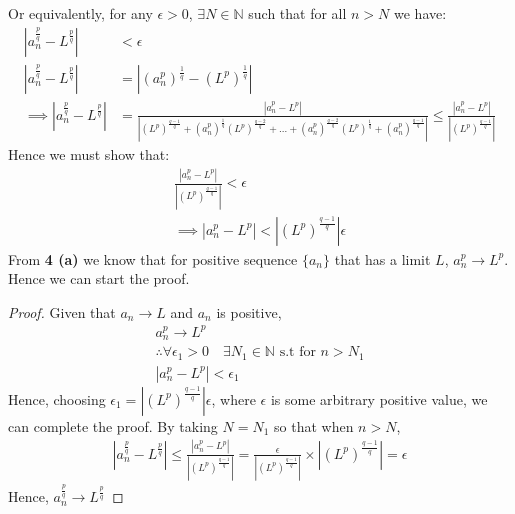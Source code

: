 \documentclass[12pt]{book}
\theoremstyle{definition}
\begin{document}
\noindent
Or equivalently, for any $\epsilon >0$, $\exists N \in \mathbb{N}$ such that for all $n>N$ we have: 
\begin{align*}
	|a_n^{\frac{p}{q}} - L^{\frac{p}{q}}| &< \epsilon\\
	|a_n^{\frac{p}{q}} - L^{\frac{p}{q}}| &= |(a_n^p)^{\frac{1}{q}}-(L^p)^{\frac{1}{q}}|\\
	\implies |a_n^{\frac{p}{q}} - L^{\frac{p}{q}}| &= \frac{|a_n^p -L^p|}{|(L^p)^{\frac{q-1}{q}}+ (a_n^p)^{\frac{1}{q}}(L^p)^{\frac{q-2}{q}}+...+(a_n^p)^{\frac{q-2}{q}}(L^p)^{\frac{1}{q}}+(a_n^p)^{\frac{q-1}{q}}|} \leq \frac{|a_n^p -L^p|}{|(L^p)^{\frac{q-1}{q}}|}
\end{align*}
Hence we must show that:
\begin{align*}
\frac{|a_n^p -L^p|}{|(L^p)^{\frac{q-1}{q}}|} < \epsilon \\
\implies |a_n^p -L^p| < |(L^p)^{\frac{q-1}{q}}|\epsilon
\end{align*}
From \textbf{4 (a)} we know that for positive sequence $\{a_n\}$ that has a limit $L$, $a_n^p \to L^p$. Hence we can start the proof.


\begin{proof}
Given that $a_n \to L$ and $a_n$ is positive,  
\begin{gather*}
a_n^p\to L^p \\
\therefore 	\forall \epsilon_1 > 0 \quad \exists N_1 \in \mathbb{N} \text{ s.t for } n > N_1  \\
|a_n^p - L^p| < \epsilon_1
\end{gather*}
Hence, choosing $\epsilon_1 = |(L^p)^{\frac{q-1}{q}}|\epsilon$, where $\epsilon$ is some arbitrary positive value, we can complete the proof.
By taking $N = N_1$ so that when $n> N$,
\begin{align*}
|a_n^{\frac{p}{q}} - L^{\frac{p}{q}}| \leq \frac{|a_n^p -L^p|}{|(L^p)^{\frac{q-1}{q}}|} = \frac{\epsilon}{|(L^p)^{\frac{q-1}{q}}|} \times |(L^p)^{\frac{q-1}{q}}| = \epsilon 
\end{align*}
Hence, $a_n^{\frac{p}{q}} \to L^{\frac{p}{q}}$ 
\end{proof}  





\end{document}
